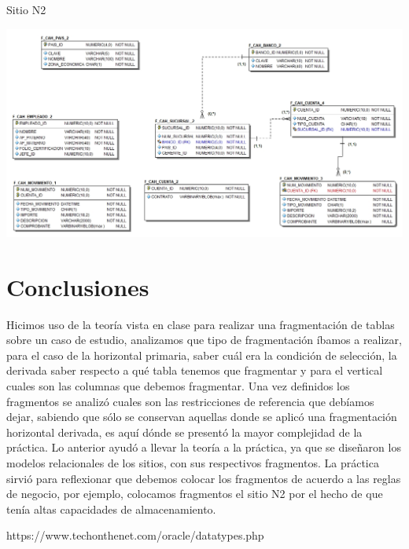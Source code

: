 \documentclass{article}
\begin{document}
\begin{landscape}
    \newpage
    {\LARGE Sitio N2 \par}
    \includegraphics[scale=0.5]{images/P4_N2.jpg}

    \end{landscape}

    \newpage
    
    \section{Conclusiones}
    Hicimos uso de la teoría vista en clase para realizar una fragmentación de tablas sobre un caso de estudio, analizamos que tipo de fragmentación íbamos a realizar, para el caso de la horizontal primaria, saber cuál era la condición de selección, la derivada saber respecto a qué tabla tenemos que fragmentar y para el vertical cuales son las columnas que debemos fragmentar. Una vez definidos los fragmentos se analizó cuales son las restricciones de referencia que debíamos dejar, sabiendo que sólo se conservan aquellas donde se aplicó una fragmentación horizontal derivada, es aquí dónde se presentó la mayor complejidad de la práctica. Lo anterior ayudó a llevar la teoría a la práctica, ya que se diseñaron los modelos relacionales de los sitios, con sus respectivos fragmentos. La práctica sirvió para reflexionar que debemos colocar los fragmentos de acuerdo a las reglas de negocio, por ejemplo, colocamos fragmentos el sitio N2 por el hecho de que tenía altas capacidades de almacenamiento. 
    
    \begin{thebibliography}{1}
  https://www.techonthenet.com/oracle/datatypes.php
\end{thebibliography}
\end{document}
